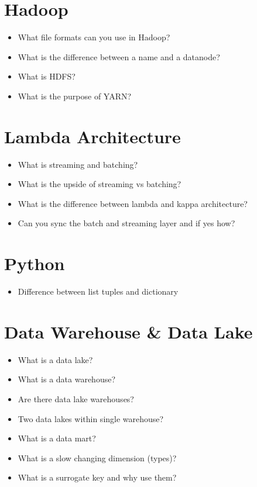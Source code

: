 \documentclass[12pt, numbers=noenddot]{scrreprt} %
\begin{document}
\section*{Hadoop}

\begin{itemize}
\item What file formats can you use in Hadoop?
\item What is the difference between a name and a datanode?
\item What is HDFS?
\item What is the purpose of YARN?
\end{itemize}

\section*{Lambda Architecture}

\begin{itemize}
\item What is streaming and batching?
\item What is the upside of streaming vs batching?
\item What is the difference between lambda and kappa architecture?
\item Can you sync the batch and streaming layer and if yes how?
\end{itemize}


\section*{Python}

\begin{itemize}
\item Difference between list tuples and dictionary
\end{itemize}

\section*{Data Warehouse \& Data Lake}

\begin{itemize}
\item What is a data lake?
\item What is a data warehouse?
\item Are there data lake warehouses?
\item Two data lakes within single warehouse?
\item What is a data mart?
\item What is a slow changing dimension (types)?
\item What is a surrogate key and why use them?
\end{itemize}
\end{document}
